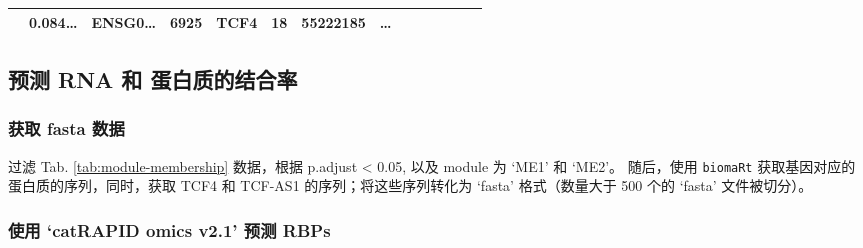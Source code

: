 \documentclass[
]{article}
\begin{document}
\begin{longtable}[]{@{}llllllllllllll@{}}
\begin{minipage}[t]{0.03\columnwidth}
\end{minipage} & \begin{minipage}[t]{0.05\columnwidth}\raggedright
0.084\ldots{}\strut
\end{minipage} & \begin{minipage}[t]{0.05\columnwidth}\raggedright
ENSG0\ldots{}\strut
\end{minipage} & \begin{minipage}[t]{0.05\columnwidth}\raggedright
6925\strut
\end{minipage} & \begin{minipage}[t]{0.05\columnwidth}\raggedright
TCF4\strut
\end{minipage} & \begin{minipage}[t]{0.05\columnwidth}\raggedright
18\strut
\end{minipage} & \begin{minipage}[t]{0.05\columnwidth}\raggedright
55222185\strut
\end{minipage} & \begin{minipage}[t]{0.02\columnwidth}\raggedright
\ldots{}\strut
\end{minipage}\tabularnewline
\bottomrule
\end{longtable}

\hypertarget{ux9884ux6d4b-rna-ux548c-ux86cbux767dux8d28ux7684ux7ed3ux5408ux7387}{%
\subsection{预测 RNA 和 蛋白质的结合率}\label{ux9884ux6d4b-rna-ux548c-ux86cbux767dux8d28ux7684ux7ed3ux5408ux7387}}

\hypertarget{ux83b7ux53d6-fasta-ux6570ux636e}{%
\subsubsection{获取 fasta 数据}\label{ux83b7ux53d6-fasta-ux6570ux636e}}

过滤 Tab. \ref{tab:module-membership} 数据，根据 p.adjust \textless{} 0.05, 以及 module 为 `ME1' 和 `ME2'。
随后，使用 \texttt{biomaRt} 获取基因对应的蛋白质的序列，同时，获取 TCF4 和 TCF-AS1 的序列；将这些序列转化为 `fasta'
格式（数量大于 500 个的 `fasta' 文件被切分）。

\hypertarget{ux4f7fux7528-catrapid-omics-v2.1-ux9884ux6d4b-rbps}{%
\subsubsection{使用 `catRAPID omics v2.1' 预测 RBPs}\label{ux4f7fux7528-catrapid-omics-v2.1-ux9884ux6d4b-rbps}}
\end{document}
